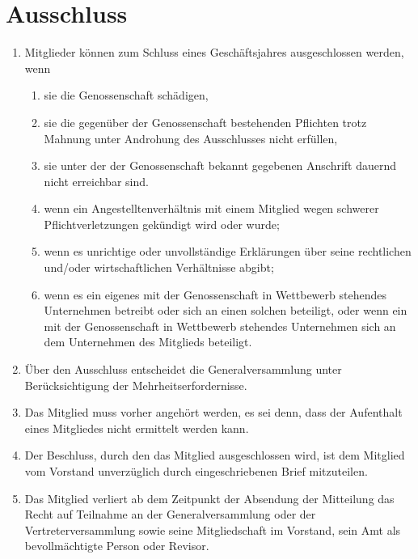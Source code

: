 \documentclass[a4paper, 12pt]{scrartcl}
\begin{document}
\section{Ausschluss}
\begin{enumerate}
  \item Mitglieder können zum Schluss eines Geschäftsjahres ausgeschlossen werden, wenn
  \begin{enumerate}
    \item sie die Genossenschaft schädigen,
    \item sie die gegenüber der Genossenschaft bestehenden Pflichten trotz Mahnung unter Androhung des Ausschlusses nicht erfüllen,
    \item sie unter der der Genossenschaft bekannt gegebenen Anschrift dauernd nicht erreichbar sind.
    \item wenn ein Angestelltenverhältnis mit einem Mitglied wegen schwerer Pflichtverletzungen gekündigt wird oder wurde;
    \item wenn es unrichtige oder unvollständige Erklärungen über seine rechtlichen und/oder wirtschaftlichen Verhältnisse abgibt;
    \item wenn es ein eigenes mit der Genossenschaft in Wettbewerb stehendes Unternehmen betreibt oder sich an einen solchen beteiligt, oder wenn ein mit der Genossenschaft in Wettbewerb stehendes Unternehmen sich an dem Unternehmen des Mitglieds beteiligt.
  \end{enumerate}
  \item Über den Ausschluss entscheidet die Generalversammlung unter Berücksichtigung der Mehrheitserfordernisse.
  \item Das Mitglied muss vorher angehört werden, es sei denn, dass der Aufenthalt eines Mitgliedes nicht ermittelt werden kann.
  \item Der Beschluss, durch den das Mitglied ausgeschlossen wird, ist dem Mitglied vom Vorstand unverzüglich durch eingeschriebenen Brief mitzuteilen.
  \item Das Mitglied verliert ab dem Zeitpunkt der Absendung der Mitteilung das Recht auf Teilnahme an der Generalversammlung oder der Vertreterversammlung sowie seine Mitgliedschaft im Vorstand, sein Amt als bevollmächtigte Person oder Revisor.
\end{enumerate}
\end{document}

